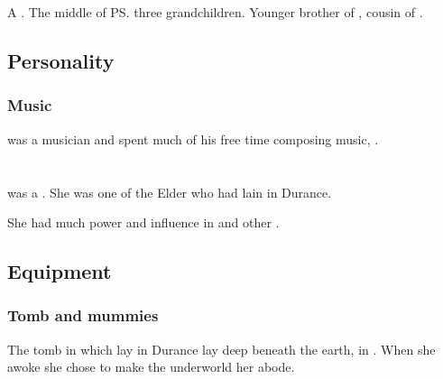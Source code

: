 \section{\Tentocoth}
\index{\Tentocoth}
A \dragon. 
The middle of \ps{\QuessanthIshnaruchaefir} three grandchildren. 
Younger brother of \Thiencaste, cousin of \Rathyon. 









\subsection{Personality}
\subsubsection{Music}
\Tentocoth{} was a musician and spent much of his free time composing music, . 















\section{\Thessulax}
\index{\Thessulax}
\Thessulax was a \dragon. 
She was one of the Elder \Dragons who had lain in Durance. 

She had much power and influence in  and other . 









\subsection{Equipment}





\subsubsection{Tomb and mummies}
The tomb in which \Thessulax lay in Durance lay deep beneath the earth, in \KaiLeng. 
When she awoke she chose to make the underworld her abode. 

